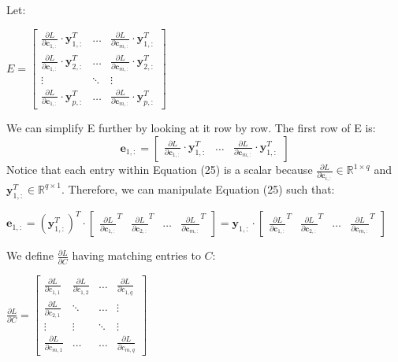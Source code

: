 \documentclass{article}
\begin{document}
Let:
\begin{center}
    $E = \begin{bmatrix}
        \frac{\partial L}{\partial \mathbf{c}_{1,:}} \cdot \mathbf{y}^T_{1,:} & \hdots & \frac{\partial L}{\partial \mathbf{c}_{m,:}} \cdot \mathbf{y}^T_{1,:} \\
        \frac{\partial L}{\partial \mathbf{c}_{1,:}} \cdot \mathbf{y}^T_{2,:}  &\hdots & \frac{\partial L}{\partial \mathbf{c}_{m, :}} \cdot \mathbf{y}^T_{2,:}\\
        \vdots & \ddots & \vdots\\
        \frac{\partial L}{\partial \mathbf{c}_{1,:}} \cdot \mathbf{y}^T_{p,:} &  \hdots & \frac{\partial L}{\partial \mathbf{c}_{m,:}} \cdot \mathbf{y}^T_{p,:} 
    \end{bmatrix}$
\end{center}
We can simplify E further by looking at it row by row. The first row of E is:
\begin{equation}
    \mathbf{e}_{1,:} = \begin{bmatrix}
        \frac{\partial L}{\partial \mathbf{c}_{1,:}} \cdot \mathbf{y}^T_{1,:} & \hdots & \frac{\partial L}{\partial \mathbf{c}_{m,:}} \cdot \mathbf{y}^T_{1,:}
    \end{bmatrix}
\end{equation}
Notice that each entry within Equation (25) is a scalar because $\frac{\partial L}{\partial \mathbf{c}_{i,:}} \in \mathbb{R}^{1\times q}$ and $\mathbf{y}^T_{1,:} \in \mathbb{R}^{q\times 1}$. Therefore, we can manipulate Equation (25) such that: 
\begin{center}
    $\mathbf{e}_{1,:} = (\mathbf{y}^T_{1,:})^{T} \cdot \begin{bmatrix}
        \frac{\partial L}{\partial \mathbf{c}_{1,:}}^{T} & \frac{\partial L}{\partial \mathbf{c}_{2,:}}^{T} & \hdots &\frac{\partial L}{\partial \mathbf{c}_{m,:}}^{T} 
    \end{bmatrix} = \mathbf{y}_{1,:} \cdot \begin{bmatrix}
        \frac{\partial L}{\partial \mathbf{c}_{1,:}}^{T} & \frac{\partial L}{\partial \mathbf{c}_{2,:}}^{T} & \hdots &\frac{\partial L}{\partial \mathbf{c}_{m,:}}^{T} 
    \end{bmatrix}$
\end{center}
We define $\frac{\partial L}{\partial C}$ having matching entries to $C$:
\begin{center}
    $\frac{\partial L}{\partial C} = \begin{bmatrix}
        \frac{\partial L}{\partial c_{1,1}} & \frac{\partial L}{\partial c_{1,2}} & \hdots &\frac{\partial L}{\partial c_{1,q} } \\
        \frac{\partial L}{\partial c_{2,1}} & \ddots & \hdots &\vdots \\
        \vdots & \vdots & \ddots & \vdots\\
        \frac{\partial L}{\partial c_{m,1}} & \hdots & \hdots &\frac{\partial L}{\partial c_{m,q}}
    \end{bmatrix}$
\end{center}
\end{document}
